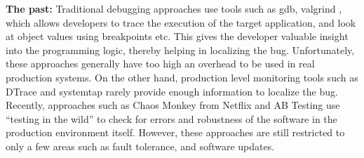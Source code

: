 \textbf{The past:} Traditional debugging approaches use tools such as gdb, valgrind \cite{valgrind}, which allows developers to trace the execution of the target application, and look at object values using breakpoints etc. This gives the developer valuable insight into the programming logic, thereby helping in localizing the bug. Unfortunately, these approaches generally have too high an overhead to be used in real production systems. On the other hand, production level monitoring tools such as DTrace \cite{dtrace} and systemtap \cite{systemtap} rarely provide enough information to localize the bug.
 Recently, approaches such as Chaos Monkey\cite{chaosmonkey} from Netflix and AB Testing\cite{abtesting}  use ``testing in the wild'' to check for errors and robustness of the software in the production environment itself. 
 However, these approaches are still restricted to only a few areas such as fault tolerance, and software updates. 






